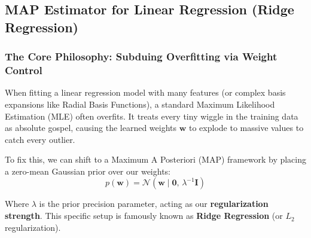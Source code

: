 \documentclass{article}
\begin{document}
\begin{table}[htbp]
\centering
\small
\renewcommand{\arraystretch}{1.4}
\caption{Operational Comparison of Gaussian Target Estimators}
\label{tab:gaussian_estimator_tradeoffs}
\end{table}

\subsection{MAP Estimator for Linear Regression (Ridge Regression)}

\subsubsection{The Core Philosophy: Subduing Overfitting via Weight Control}
When fitting a linear regression model with many features (or complex basis expansions like Radial Basis Functions), a standard Maximum Likelihood Estimation (MLE) often overfits. It treats every tiny wiggle in the training data as absolute gospel, causing the learned weights $\mathbf{w}$ to explode to massive values to catch every outlier.

To fix this, we can shift to a Maximum A Posteriori (MAP) framework by placing a zero-mean Gaussian prior over our weights:
\begin{equation}
p(\mathbf{w}) = \mathcal{N}(\mathbf{w} \mid \mathbf{0}, \, \lambda^{-1}\mathbf{I})
\end{equation}

Where $\lambda$ is the prior precision parameter, acting as our \textbf{regularization strength}. This specific setup is famously known as \textbf{Ridge Regression} (or $L_2$ regularization).
\end{document}
